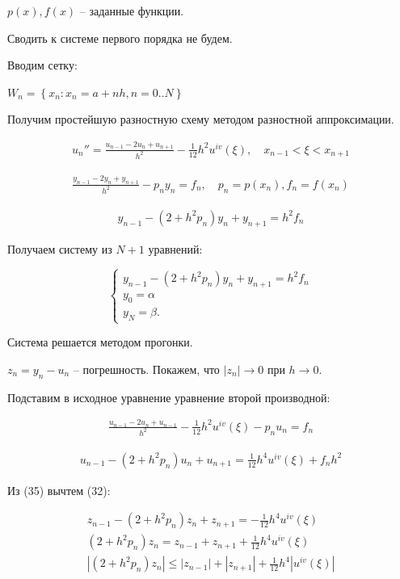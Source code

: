 \documentclass[a4paper,14pt]{article}
\begin{document}
$p(x), f(x)$ -- заданные функции.

Сводить к системе первого порядка не будем. 

Вводим сетку: 

$W_n = \left\{ x_n : x_n = a + n h, n = 0..N \right\}$

Получим простейшую разностную схему методом разностной аппроксимации.

\begin{eqnarray}
	u_n'' = \frac{u_{n-1} - 2u_n + u_{n+1}}{h^2} - \frac{1}{12} h^2 u^{iv} (\xi), \, \, \, \, \, \, x_{n-1} < \xi < x_{n+1} 
\end{eqnarray}

\begin{eqnarray}
	\frac{y_{n-1} - 2y_n + y_{n+1}}{h^2} - p_n y_n = f_n, \, \, \, \, \, \,  p_n = p(x_n), f_n = f(x_n)
\end{eqnarray}

\begin{eqnarray}
	y_{n-1} - (2 + h^2 p_n) y_n + y_{n+1} = h^2 f_n
\end{eqnarray}

Получаем систему из $N+1$ уравнений:

\begin{equation}
	\begin{cases}
		y_{n-1} - (2 + h^2 p_n) y_n + y_{n+1} = h^2 f_n \\
		y_0 = \alpha \\
		y_N = \beta.
	\end{cases}
\end{equation}

Система решается методом прогонки.

$z_n = y_n - u_n$ -- погрешность. 
Покажем, что $|z_n| \rightarrow 0$ при $h \rightarrow 0$.

Подставим в исходное уравнение уравнение второй производной:

\begin{eqnarray}
	\frac{u_{n-1} - 2u_n + u_{n-1}}{h^2} - \frac{1}{12} h^2 u^{iv}(\xi) - p_n u_n = f_n
\end{eqnarray}

\begin{eqnarray}
	u_{n-1} - (2 + h^2 p_n) u_n + u_{n+1} = \frac{1}{12} h^4 u^{iv}(\xi) + f_n h^2
\end{eqnarray}

Из (35) вычтем (32):

\begin{eqnarray}
	z_{n-1} - (2 + h^2 p_n) z_n + z_{n+1} = - \frac{1}{12} h^4 u^{iv}(\xi) \nonumber \\
	(2 + h^2 p_n)z_n = z_{n-1} + z_{n+1} + \frac{1}{12} h^4 u^{iv}(\xi) \nonumber \\
	|(2 + h^2 p_n)z_n| \leq |z_{n-1}| + |z_{n+1}| + \frac{1}{12} h^4 |u^{iv}(\xi)|
\end{eqnarray}
\end{document}
